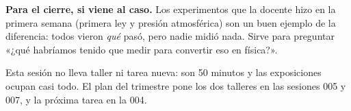 \documentclass[11pt]{article}
\begin{document}
\begin{nota}
\textbf{Para el cierre, si viene al caso.} Los experimentos que la docente hizo en la primera
semana (primera ley y presión atmosférica) son un buen ejemplo de la diferencia: todos vieron
\emph{qué} pasó, pero nadie midió nada. Sirve para preguntar «¿qué habríamos tenido que medir
para convertir eso en física?».
\end{nota}

\begin{nota}
Esta sesión no lleva taller ni tarea nueva: son 50 minutos y las exposiciones ocupan casi
todo. El plan del trimestre pone los dos talleres en las sesiones 005 y 007, y la próxima
tarea en la 004.
\end{nota}
\end{document}
